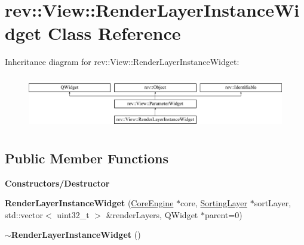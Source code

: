 \hypertarget{classrev_1_1_view_1_1_render_layer_instance_widget}{}\section{rev\+::View\+::Render\+Layer\+Instance\+Widget Class Reference}
\label{classrev_1_1_view_1_1_render_layer_instance_widget}
Inheritance diagram for rev\+::View\+::Render\+Layer\+Instance\+Widget\+:\begin{figure}[H]
\begin{center}
\leavevmode
\includegraphics[height=2.352941cm]{classrev_1_1_view_1_1_render_layer_instance_widget}
\end{center}
\end{figure}
\subsection*{Public Member Functions}
\begin{Indent}\textbf{ Constructors/\+Destructor}\par
\begin{DoxyCompactItemize}
\item 
\mbox{\label{classrev_1_1_view_1_1_render_layer_instance_widget_a8474cff9bdf0768b03e8ad6ead882a65}} 
{\bfseries Render\+Layer\+Instance\+Widget} (\mbox{\hyperlink{classrev_1_1_core_engine}{Core\+Engine}} $\ast$core, \mbox{\hyperlink{structrev_1_1_sorting_layer}{Sorting\+Layer}} $\ast$sort\+Layer, std\+::vector$<$ uint32\+\_\+t $>$ \&render\+Layers, Q\+Widget $\ast$parent=0)
\item 
\mbox{\label{classrev_1_1_view_1_1_render_layer_instance_widget_a9a5f714471b5a5f634b7144536e772f9}} 
{\bfseries $\sim$\+Render\+Layer\+Instance\+Widget} ()
\end{DoxyCompactItemize}
\end{Indent}
